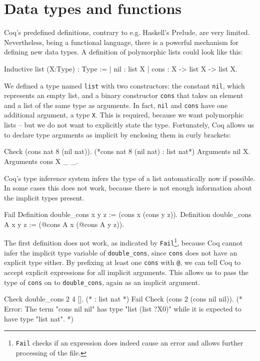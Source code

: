 \documentclass[fleqn]{scrreprt}
\newcommand{\coqinline}[1]{\texttt{#1}}
\begin{document}
\section{Data types and functions}
Coq's predefined definitions, contrary to e.g. Haskell's Prelude, are very limited. Nevertheless, being a functional language, there is a powerful mechanism for defining new data types. A definition of polymorphic lists could look like this:
\begin{coqcode}
Inductive list (X:Type) : Type :=
  | nil  : list X
  | cons : X -> list X -> list X.
\end{coqcode}
We defined a type named \coqinline{list} with two constructors: the constant \coqinline{nil}, which represents an empty list, and a binary constructor \coqinline{cons} that takes an element and a list of the same type as arguments. In fact, \coqinline{nil} and \coqinline{cons} have one additional argument, a type \coqinline{X}. This is required, because we want polymorphic lists -- but we do not want to explicitly state the type. Fortunately, Coq allows us to declare type arguments as implicit by enclosing them in curly brackets:
\begin{coqcode}
Check (cons nat 8 (nil nat)). (*cons nat 8 (nil nat) : list nat*)
Arguments nil {X}.
Arguments cons {X} _ _.
\end{coqcode}
Coq's type inference system infers the type of a list automatically now if possible. In some cases this does not work, because there is not enough information about the implicit types present. 
\begin{coqcode}
Fail Definition double_cons x y z := (cons x (cons y z)).
Definition double_cons {A} x y z := (@cons A x (@cons A y z)).
\end{coqcode}
The first definition does not work, as indicated by \coqinline{Fail}\footnote{\coqinline{Fail} checks if an expression does indeed cause an error and allows further processing of the file.}, because Coq cannot infer the implicit type variable of \coqinline{double_cons}, since \coqinline{cons} does not have an explicit type either. By prefixing at least one \coqinline{cons} with \coqinline{@}, we can tell Coq to accept explicit expressions for all implicit arguments. This allows us to pass the type of \coqinline{cons} on to \coqinline{double_cons}, again as an implicit argument.
\begin{coqcode}
Check double_cons 2 4 []. (* : list nat *)
Fail Check (cons 2 (cons nil nil)). 
(* Error: The term "cons nil nil" has type "list (list ?X0)"
while it is expected to have type "list nat". *)
\end{coqcode}
\end{document}
